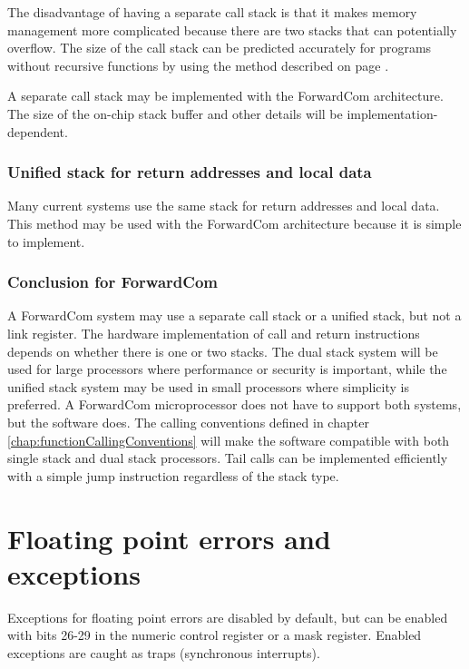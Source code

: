 \documentclass[forwardcom.tex]{subfiles}
\begin{document}
The disadvantage of having a separate call stack is that it makes memory management more complicated because there are two stacks that can potentially overflow. The size of the call stack can be predicted accurately for programs without recursive functions by using the method described on page \pageref{predictingStackSize}.
\vspace{2mm}

A separate call stack may be implemented with the ForwardCom architecture. The size of the on-chip stack buffer and other details will be implementation-dependent.

\subsubsection{Unified stack for return addresses and local data} \label{singleStack}
Many current systems use the same stack for return addresses and local data. This method may be used with the ForwardCom architecture because it is simple to implement. 

\subsubsection{Conclusion for ForwardCom}
A ForwardCom system may use a separate call stack or a unified stack, but not a link register. The hardware implementation of call and return instructions depends on whether there is one or two stacks. The dual stack system will be used for large processors where performance or security is important, while the unified stack system may be used in small processors where simplicity is preferred. A ForwardCom microprocessor does not have to support both systems, but the software does. 
The calling conventions defined in chapter \ref{chap:functionCallingConventions} will make the software compatible with both single stack and dual stack processors.
Tail calls can be implemented efficiently with a simple jump instruction regardless of the stack type.
\vspace{2mm}

\section{Floating point errors and exceptions}
Exceptions for floating point errors are disabled by default, but can be enabled with bits 26-29 in the numeric control register or a mask register. Enabled exceptions are caught as traps (synchronous interrupts).
\vspace{2mm}
\end{document}
